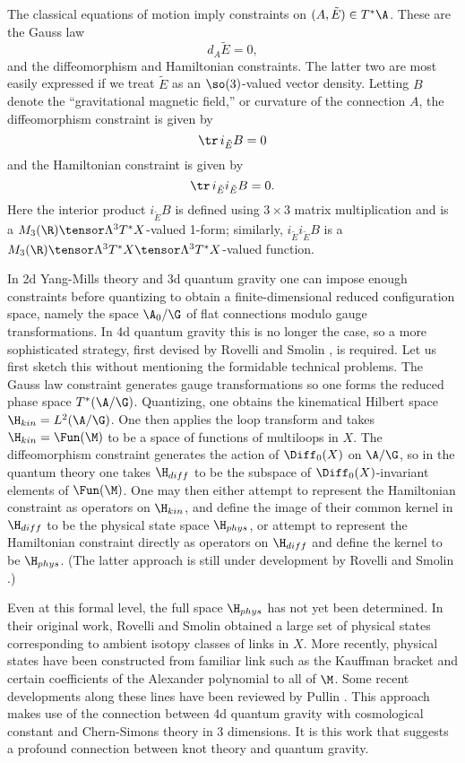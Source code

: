 The classical equations of motion imply constraints on $(A,\tilde E) \in
T^\ast \A$.  These are the Gauss law
\[          d_A \tilde E = 0, \]
and the diffeomorphism and Hamiltonian constraints.  The latter two are
most easily expressed if we treat $\tilde E$ as an $\so(3)$-valued
vector density.    Letting $B$ denote the ``gravitational magnetic field,'' or
curvature of the connection $A$, the diffeomorphism constraint is given
by
\[      \tr \,i_{\tilde E} B = 0 \]
and the Hamiltonian constraint is given by
\[      \tr\, i_{\tilde E} i_{\tilde E} B = 0 .\]
Here the interior product $i_{\tilde E} B$ is defined using $3\times 3$ matrix
multiplication and is a $M_3(\R) \tensor \Lambda^3 T^\ast X$-valued 1-form;
similarly, $i_{\tilde E} i_{\tilde E} B$ is a $M_3(\R) \tensor \Lambda^3
T^\ast X \tensor \Lambda^3 T^\ast X$-valued function.


In 2d Yang-Mills theory and 3d quantum gravity one can impose enough
constraints before quantizing to obtain a finite-dimensional reduced
configuration space, namely the space $\A_0/\G$ of flat connections modulo
gauge transformations.  In 4d quantum gravity this is no longer the case,
so a more sophisticated strategy, first devised by Rovelli
and Smolin \cite{RS}, is required.  Let us first sketch this without
mentioning the
formidable technical problems.   The Gauss law constraint generates gauge
transformations so one forms the reduced phase space $T^\ast(\A/\G)$.
Quantizing, one obtains the kinematical Hilbert space $\H_{kin} =
L^2(\A/\G)$.  One then applies the loop transform and takes
$\H_{kin} = \Fun(\M)$ to be a space of functions of multiloops in $X$.  The
diffeomorphism constraint generates the action of $\Diff_0(X)$ on $\A/\G$,
so in the quantum theory one takes $\H_{diff}$ to be the subspace of
$\Diff_0(X)$-invariant elements of $\Fun(\M)$.  One may then either attempt
to represent the Hamiltonian constraint as operators on $\H_{kin}$, and
define the image of their common kernel in $\H_{diff}$ to be the physical
state space $\H_{phys}$, or attempt to represent the Hamiltonian constraint
directly as operators on $\H_{diff}$ and define the kernel to be
$\H_{phys}$.  (The latter approach is still under development by Rovelli
and Smolin \cite{RS2}.)

Even at this formal level, the full space $\H_{phys}$ has not yet been
determined.  In their original work, Rovelli and Smolin \cite{RS} obtained
a large set of physical states corresponding to ambient isotopy classes of
links in $X$.  More recently, physical states have been constructed from
familiar link such as the Kauffman bracket and certain coefficients of the
Alexander polynomial to all of $\M$.   Some recent developments along these
lines have been reviewed by Pullin \cite{Pullin}.  This approach makes use
of the connection between 4d quantum gravity with cosmological constant and
Chern-Simons theory in 3 dimensions.   It is this work that suggests a
profound connection between knot theory and quantum gravity.

